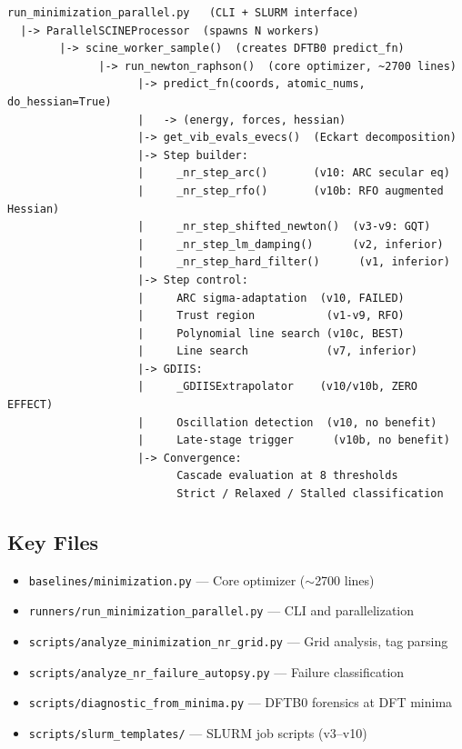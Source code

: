\documentclass[11pt,a4paper]{article}
\theoremstyle{definition}
\begin{document}
\begin{verbatim}
run_minimization_parallel.py   (CLI + SLURM interface)
  |-> ParallelSCINEProcessor  (spawns N workers)
        |-> scine_worker_sample()  (creates DFTB0 predict_fn)
              |-> run_newton_raphson()  (core optimizer, ~2700 lines)
                    |-> predict_fn(coords, atomic_nums, do_hessian=True)
                    |   -> (energy, forces, hessian)
                    |-> get_vib_evals_evecs()  (Eckart decomposition)
                    |-> Step builder:
                    |     _nr_step_arc()       (v10: ARC secular eq)
                    |     _nr_step_rfo()       (v10b: RFO augmented Hessian)
                    |     _nr_step_shifted_newton()  (v3-v9: GQT)
                    |     _nr_step_lm_damping()      (v2, inferior)
                    |     _nr_step_hard_filter()      (v1, inferior)
                    |-> Step control:
                    |     ARC sigma-adaptation  (v10, FAILED)
                    |     Trust region           (v1-v9, RFO)
                    |     Polynomial line search (v10c, BEST)
                    |     Line search            (v7, inferior)
                    |-> GDIIS:
                    |     _GDIISExtrapolator    (v10/v10b, ZERO EFFECT)
                    |     Oscillation detection  (v10, no benefit)
                    |     Late-stage trigger      (v10b, no benefit)
                    |-> Convergence:
                          Cascade evaluation at 8 thresholds
                          Strict / Relaxed / Stalled classification
\end{verbatim}

\subsection{Key Files}
\begin{itemize}[nosep]
  \item \texttt{baselines/minimization.py} --- Core optimizer ($\sim$2700 lines)
  \item \texttt{runners/run\_minimization\_parallel.py} --- CLI and parallelization
  \item \texttt{scripts/analyze\_minimization\_nr\_grid.py} --- Grid analysis, tag parsing
  \item \texttt{scripts/analyze\_nr\_failure\_autopsy.py} --- Failure classification
  \item \texttt{scripts/diagnostic\_from\_minima.py} --- DFTB0 forensics at DFT minima
  \item \texttt{scripts/slurm\_templates/} --- SLURM job scripts (v3--v10)
\end{itemize}
\end{document}

